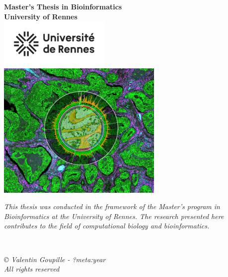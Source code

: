 \documentclass[
  11pt,
  a4paper,
]{report}
\begin{document}
\newpage  %
\thispagestyle{empty}  %
\begin{center}
  {\Huge \textbf{Master's Thesis in Bioinformatics}} \\[2cm]
  {\Large \textbf{University of Rennes}} \\[1cm]
  \includegraphics[width=0.4\textwidth]{figures/logo_Univ_Rennes.png} \\[1cm]
  \includegraphics[width=0.6\textwidth]{figures/couverture.jpg} \\[1cm]
  \begin{minipage}{0.8\textwidth}
    \centering
    \textit{This thesis was conducted in the framework of the Master's program in Bioinformatics at the University of Rennes. The research presented here contributes to the field of computational biology and bioinformatics.}
  \end{minipage} \\[1cm]
  \begin{minipage}{0.8\textwidth}
    \centering
    \small
    \textit{© Valentin Goupille - ?meta:year \\ All rights reserved}
  \end{minipage}
\end{center} 
\end{document}
